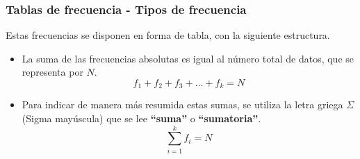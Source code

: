 \documentclass[10pt]{beamer}
\theoremstyle{plain} %
\theoremstyle{definition}
\theoremstyle{remark}
\begin{document}
\begin{frame}
\frametitle{Tablas de frecuencia - Tipos de frecuencia}
Estas frecuencias se disponen en forma de tabla, con la
siguiente estructura.
\begin{center}
\end{center}

\begin{itemize}[<+->]
\justifying
\item La suma de las frecuencias absolutas es igual al número total de datos, que se representa por $N$.
$$f_1+f_2+f_3+\ldots+f_k=N$$
\item Para indicar de manera más resumida estas sumas, se utiliza la letra griega $\Sigma$ (Sigma mayúscula) que se lee \textbf{``suma''} o \textbf{``sumatoria''}.
$$\sum_{i=1}^{k} f_i=N$$

\end{itemize} 
\end{frame}
\end{document}
